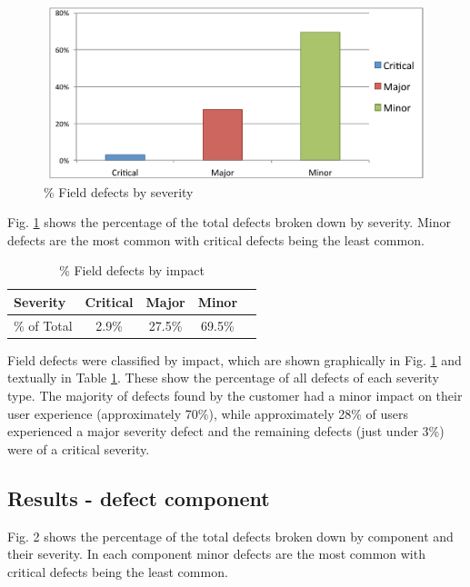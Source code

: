 \begin{figure}
\begin{center}
\includegraphics[height=5cm, width=14cm]{graphs/social_test/graph1.pdf} 
\caption{\% Field defects by severity}
\end{center}
\label{fig:socialtestdefectimpact}
\end{figure}

Fig. \ref{fig:socialtestdefectimpact} shows the percentage of the total defects broken down by severity. Minor defects are the most common with critical defects being the least common.



\begin {table}
\caption {\% Field defects by impact}
\begin{center}
\begin{tabular}{l*{3}{c}r} Severity & Critical & Major & Minor \\ \hline \% of Total  & 2.9\% & 27.5\% & 69.5\% 
\end{tabular}
\end{center}
\label{tab:socialtestdefectimpact}
\end{table}


Field defects were classified by impact, which are shown graphically in Fig. \ref{fig:socialtestdefectimpact} and textually in Table \ref{fig:socialtestdefectimpact}.  These show the percentage of all defects of each severity type. The majority of defects found by the customer had a minor impact on their user experience (approximately 70\%), while approximately 28\% of users experienced a major severity defect and the remaining defects (just under 3\%) were of a critical severity.

\subsection{Results - defect component}

Fig. 2  shows the percentage of the total defects broken down by component and their severity. In each component minor defects are the most common with critical defects being the least common.

